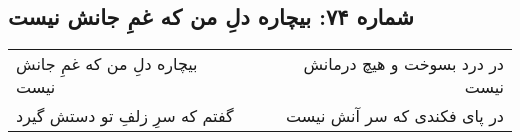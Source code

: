 \begin{center}
\section*{شماره ۷۴: بیچاره دلِ من که غمِ جانش نیست}
\label{sec:074}
\begin{longtable}{l p{0.5cm} r}
بیچاره دلِ من که غمِ جانش نیست
&&
در درد بسوخت و هیچ درمانش نیست
\\
گفتم که سرِ زلفِ تو دستش گیرد
&&
در پای فکندی که سر آنش نیست
\\
\end{longtable}
\end{center}
